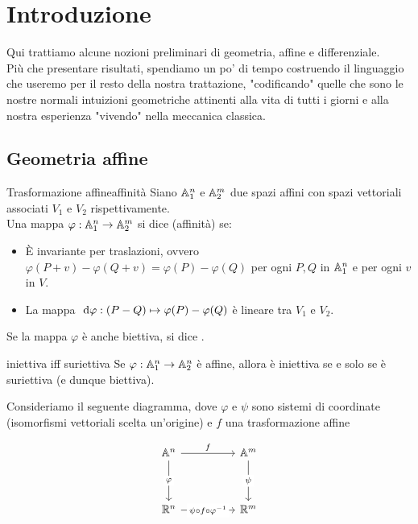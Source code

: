 \documentclass[annatarbolditalic, openany]{book}
\begin{document}
\chapter{Introduzione}

Qui trattiamo alcune nozioni preliminari di geometria, affine e differenziale.\\
Più che presentare risultati, spendiamo un po' di tempo costruendo il linguaggio che useremo per il resto della nostra trattazione, "codificando" quelle che sono le nostre normali intuizioni geometriche attinenti alla vita di tutti i giorni e alla nostra esperienza "vivendo" nella meccanica classica.

\section{Geometria affine}

\begin{definition}{Trasformazione affine}{affinità}
    Siano $\mathbb{A}_1^n$ e $\mathbb{A}_2^m$ due spazi affini con spazi vettoriali associati $V_1$ e $V_2$ rispettivamente.\\
    Una mappa $\varphi : \mathbb{A}_1^n \to \mathbb{A}_2^m$ si dice  (affinità) se: \begin{itemize}
        \item È invariante per traslazioni, ovvero $\varphi(P+v) - \varphi(Q+v) = \varphi(P) - \varphi(Q)$ per ogni $P,Q$ in $\mathbb{A}_1^n$ e per ogni $v$ in $V$.
        \item La mappa $\text{ d}\varphi : (P-Q)\mapsto \varphi(P) - \varphi(Q)$ è lineare tra $V_1$ e $V_2$.
    \end{itemize}
    Se la mappa $\varphi$ è anche biettiva, si dice .
\end{definition}

\begin{proposition}{}{iniettiva iff suriettiva}
    Se $\varphi : \mathbb{A}_1^n \to \mathbb{A}_2^n$ è affine, allora è iniettiva se e solo se è suriettiva (e dunque biettiva).
\end{proposition}

Consideriamo il seguente diagramma, dove $\varphi$ e $\psi$ sono sistemi di coordinate (isomorfismi vettoriali scelta un'origine) e $f$ una trasformazione affine 

\[\begin{tikzcd}
	{\A^n} && {\A^m} \\
	\\
	{\R^n} && {\R^m}
	\arrow["f", from=1-1, to=1-3]
	\arrow["\varphi"{description}, from=1-1, to=3-1]
	\arrow["\psi"{description}, from=1-3, to=3-3]
	\arrow["{\psi \circ f \circ \varphi^{-1}}"{description}, from=3-1, to=3-3]
\end{tikzcd}\]
\end{document}
